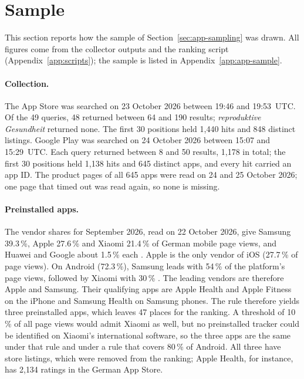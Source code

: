 \section{Sample}
\label{sec:results-sample}
This section reports how the sample of Section~\ref{sec:app-sampling} was
drawn. All figures come from the collector outputs and the ranking script
(Appendix~\ref{app:scripts}); the sample is listed in
Appendix~\ref{app:app-sample}.

\paragraph{Collection.} The App Store was searched on 23 October 2026 between
19:46 and 19:53~UTC\@. Of the 49 queries, 48 returned between 64 and 190 results;
\emph{reproduktive Gesundheit} returned none. The first 30 positions held 1{,}440
hits and 848 distinct listings. Google Play was searched on 24 October 2026
between 15:07 and 15:29~UTC\@. Each query returned between 8 and 50 results, 1{,}178
in total; the first 30 positions held 1{,}138 hits and 645 distinct apps, and
every hit carried an app ID\@. The product pages of all 645 apps were read on
24 and 25 October 2026; one page that timed out was read again, so none is
missing.

\paragraph{Preinstalled apps.} The vendor shares for September 2026, read on
22 October 2026, give Samsung 39.3\,\%, Apple 27.6\,\% and Xiaomi 21.4\,\% of
German mobile page views, and Huawei and Google about 1.5\,\% each
\parencite{statcounter2026vendor}. Apple is the only vendor of iOS (27.7\,\% of
page views). On Android (72.3\,\%), Samsung leads with 54\,\% of the
platform's page views, followed by Xiaomi with 30\,\%
\parencite{statcounter2026os}. The leading vendors are therefore Apple and
Samsung. Their qualifying apps are Apple Health and Apple Fitness on the iPhone
and Samsung Health on Samsung phones. The rule therefore yields three
preinstalled apps, which leaves 47 places for the ranking. A threshold of 10\,\%
of all page views would admit Xiaomi as well, but no preinstalled tracker could
be identified on Xiaomi's international software, so the three apps are the same
under that rule and under a rule that covers 80\,\% of Android. All three have store listings, which
were removed from the ranking; Apple Health, for instance, has 2{,}134 ratings
in the German App Store.

